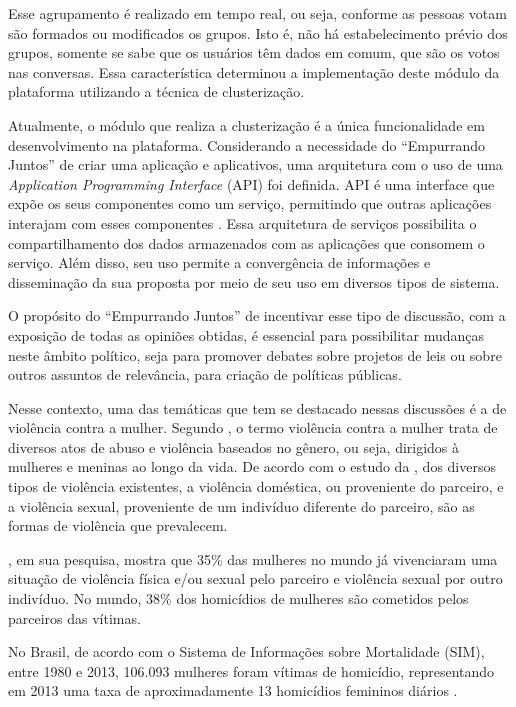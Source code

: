 Esse agrupamento é realizado em tempo real, ou seja, conforme as pessoas votam são formados ou modificados os grupos. 
Isto é, não há estabelecimento prévio dos grupos, somente se sabe que os usuários têm dados em comum, que são os votos nas conversas. Essa característica determinou a implementação deste módulo da plataforma utilizando a técnica de clusterização.

Atualmente, o módulo que realiza a clusterização é a única funcionalidade em desenvolvimento na plataforma. Considerando a necessidade do
``Empurrando Juntos'' de criar uma aplicação e aplicativos, uma arquitetura com o uso de uma \textit{Application Programming Interface} (API) foi
definida. API é uma interface que expõe os seus componentes como um serviço, permitindo que outras aplicações interajam com esses 
componentes \cite{wagh2012comparative, understanding_web}. Essa arquitetura de serviços possibilita o compartilhamento dos dados 
armazenados com as aplicações que consomem o serviço. Além disso, 
seu uso permite a convergência de informações e disseminação da sua proposta por meio de seu uso em diversos tipos de sistema.

O propósito do ``Empurrando Juntos'' de incentivar esse tipo de discussão, com a exposição de todas as opiniões obtidas, é essencial para possibilitar mudanças neste âmbito político, seja para promover debates sobre projetos de leis ou sobre outros assuntos de relevância, para criação de políticas públicas.

Nesse contexto, uma das temáticas que tem se destacado nessas discussões é a de violência contra a mulher. Segundo , 
o termo violência contra a mulher trata de
diversos atos de abuso e violência baseados no gênero, ou seja, dirigidos à mulheres e meninas ao longo da vida.
De acordo com o estudo da , dos diversos tipos de violência existentes, a violência doméstica, ou proveniente do parceiro,
e a violência sexual, proveniente de um indivíduo diferente do parceiro, são as formas de violência que prevalecem.

, em sua pesquisa, mostra que 
35\% das mulheres no mundo já vivenciaram 
uma situação de violência física e/ou sexual pelo parceiro e violência sexual por outro indivíduo. No mundo, 38\% dos homicídios de mulheres são cometidos 
pelos parceiros das vítimas.

No Brasil, de acordo com o Sistema de Informações sobre Mortalidade (SIM), entre 1980 e 2013, 106.093 mulheres foram vítimas de homicídio, 
representando em 2013 uma taxa de aproximadamente 13 homicídios femininos
diários \cite{mapa_violencia_2015}. 

